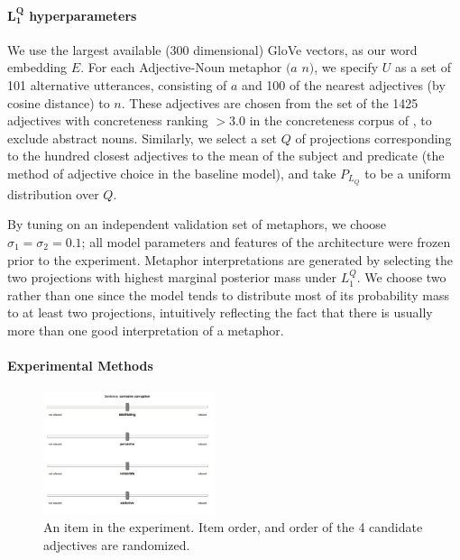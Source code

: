 \documentclass[9pt,twocolumn,twoside,lineno]{pnas-new}
\newcommand{\Listener}{L}
\newcommand{\QLONE}{\Listener_{{1}}^{{Q}}}
\begin{document}
{	%



	\paragraph{$\mathbf{\QLONE}$ hyperparameters}

		We use the largest available (300 dimensional) GloVe vectors, as our word embedding $E$. For each Adjective-Noun metaphor $(a$ $n)$, we specify $U$ as a set of 101 alternative utterances, consisting of $a$ and 100 of the nearest adjectives (by cosine distance) to $n$. These adjectives are chosen from the set of the 1425 adjectives with concreteness ranking $>3.0$ in the concreteness corpus of \cite{brysbaert2014concreteness}, to exclude abstract nouns.
		Similarly, we select a set $Q$ of projections corresponding to the hundred closest adjectives to the mean of the subject and predicate (the method of adjective choice in the baseline model), and take $P_{L_Q}$ to be a uniform distribution over $Q$. 

		By tuning on an independent validation set of metaphors, we choose $\sigma_1=\sigma_2=0.1$; all model parameters and features of the architecture were frozen prior to the experiment. Metaphor interpretations are generated by selecting the two projections with highest marginal posterior mass under $\QLONE$. We choose two rather than one since the model tends to distribute most of its probability mass to at least two projections, intuitively reflecting the fact that there is usually more than one good interpretation of a metaphor.

\paragraph{Experimental Methods}

\begin{figure}
\centering
\includegraphics[width=0.45\textwidth]{images/slide.png}
\caption{An item in the experiment. Item order, and order of the 4 candidate adjectives are randomized.}
\label{fig:slide}
\end{figure}

}
\end{document}
